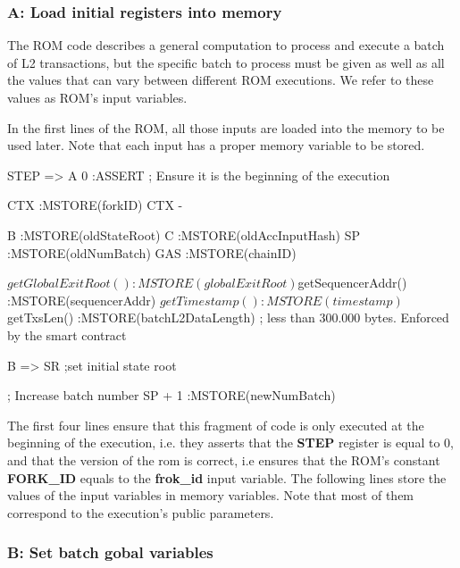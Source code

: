 \subsubsection{A: Load initial registers into memory}

The ROM code describes a general computation to process and execute a batch of L2 transactions, but the specific batch to process must be given as well as all the values that can vary between different ROM executions. We refer to these values as ROM's input variables.

In the first lines of the ROM, all those inputs are loaded into the memory to be used later. Note that each input has a proper memory variable to be stored.


\begin{zkasm}
STEP => A
0                                   :ASSERT ; Ensure it is the beginning of the execution

CTX                                 :MSTORE(forkID)
CTX - %

B                                   :MSTORE(oldStateRoot)
C                                   :MSTORE(oldAccInputHash)
SP                                  :MSTORE(oldNumBatch)
GAS                                 :MSTORE(chainID)

${getGlobalExitRoot()}              :MSTORE(globalExitRoot)
${getSequencerAddr()}               :MSTORE(sequencerAddr)
${getTimestamp()}                   :MSTORE(timestamp)
${getTxsLen()}                      :MSTORE(batchL2DataLength) ; less than 300.000 bytes. Enforced by the smart contract

B => SR ;set initial state root

; Increase batch number
SP + 1                              :MSTORE(newNumBatch)
\end{zkasm}

The first four lines ensure that this fragment of code is only executed at the beginning of the execution, i.e. they asserts that the \textbf{STEP} register is equal to 0, and that the version of the rom is correct, i.e ensures that the ROM's constant \textbf{FORK\_ID} equals to the \textbf{frok\_id} input variable. The following lines store the values of the input variables in memory variables. Note that most of them correspond to the execution's public parameters.

\subsubsection{B: Set batch gobal variables}

